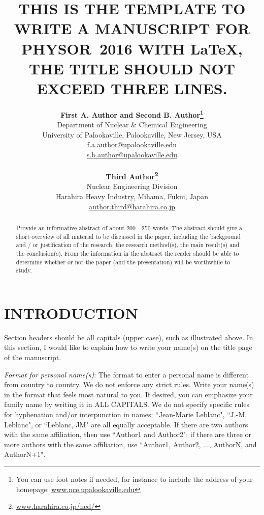 \documentclass[12pt]{article}
\title{THIS IS THE TEMPLATE TO WRITE A MANUSCRIPT FOR PHYSOR~2016 WITH \LaTeX, THE TITLE SHOULD NOT EXCEED THREE LINES.}
\author{ 
  \textbf{First A. Author and Second B. Author\footnote{You can use foot notes if needed, for instance to include the address of your homepage: \href{http://www.nce.upalookaville.edu/}{www.nce.upalookaville.edu}}} \\
  Department of Nuclear \& Chemical Engineering \\
  University of Palookaville, Palookaville, New Jersey, USA\\
  \href{mailto:f.a.author@upalookaville.edu}{f.a.author@upalookaville.edu}\\
  \href{mailto:s.b.author@upalookaville.edu}{s.b.author@upalookaville.edu}\\
  \\                       %
  \textbf{Third Author\footnote{\href{http://www.harahira.co.jp/ned/}{www.harahira.co.jp/ned/}}} \\
  Nuclear Engineering Division \\
  Harahira Heavy Industry, Mihama, Fukui, Japan\\
  \href{mailto:author.third@harahira.co.jp}{author.third@harahira.co.jp}
}
\begin{document}


\maketitle

\begin{abstract}
  Provide an informative abstract of about 200 - 250 words. The abstract should give a short overview of all material to be discussed in the paper, including the background and / or justification of the research, the research method(s), the main result(s) and the conclusion(s). From the information in the abstract the reader should be able to determine whether or not the paper (and the presentation) will be worthwhile to study.
\end{abstract}


%
\section{INTRODUCTION}
\label{sect::intro}

Section headers should be all capitals (upper case), such as illustrated above. In this section, I would like to explain how to write your name(s) on the title page of the manuscript. 

\emph{Format for personal name(s)}: The format to enter a personal name is different from country to country. We do not enforce any strict rules. Write your name(s) in the format that feels most natural to you. If desired, you can emphasize your family name by writing it in ALL CAPITALS. We do not specify specific rules for hyphenation and/or interpunction in names: ``Jean-Marie Leblanc", ``J.-M. Leblanc", or ``Leblanc, JM" are all equally acceptable. If there are two authors with the same affiliation, then use ``Author1 and Author2"; if there are three or more authors with the same affiliation, use ``Author1, Author2, ..., AuthorN, and AuthorN+1".
\end{document}
